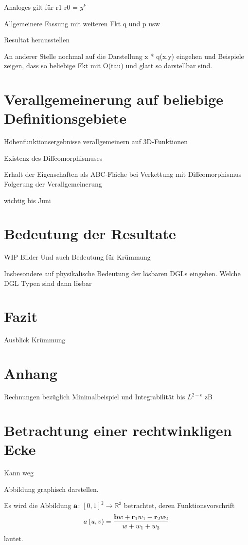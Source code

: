 \documentclass[10pt,a4paper,oneside]{report}
\newcommand{\R}{\mathbb{R}}
\begin{document}
Analoges gilt für r1-r0 = $y^k$

Allgemeinere Fassung mit weiteren Fkt q und p usw

Resultat herausstellen

An anderer Stelle nochmal auf die Darstellung x * q(x,y) eingehen und Beispiele zeigen, dass so beliebige Fkt mit O(tau) und glatt so darstellbar sind.

\chapter{Verallgemeinerung auf beliebige Definitionsgebiete}
Höhenfunktionsergebnisse verallgemeinern auf 3D-Funktionen

Existenz des Diffeomorphismuses

Erhalt der Eigenschaften als ABC-Fläche bei Verkettung mit Diffeomorphismus
Folgerung der Verallgemeinerung


wichtig bis Juni

\chapter{Bedeutung der Resultate}
WIP
Bilder
Und auch Bedeutung für Krümmung

Insbesondere auf physikalische Bedeutung der lösbaren DGLs eingehen. Welche DGL Typen sind dann lösbar

\chapter{Fazit}
Ausblick Krümmung


\chapter{Anhang}
Rechnungen bezüglich Minimalbeispiel und Integrabilität bis $L^{2-\epsilon}$ zB

\chapter{Betrachtung einer rechtwinkligen Ecke}
Kann weg


Abbildung graphisch darstellen. 

Es wird die Abbildung $\bold{a}$: $\left[0,1\right]^2 \to \R^3$ betrachtet, deren Funktionsvorschrift 
\begin{align*}
a\left(u,v\right) = \frac{\bold{b} w + \bold{r}_1 w_1 + \bold{r}_2 w_2}{w+w_1+w_2}
\end{align*}
lautet.
\end{document}
